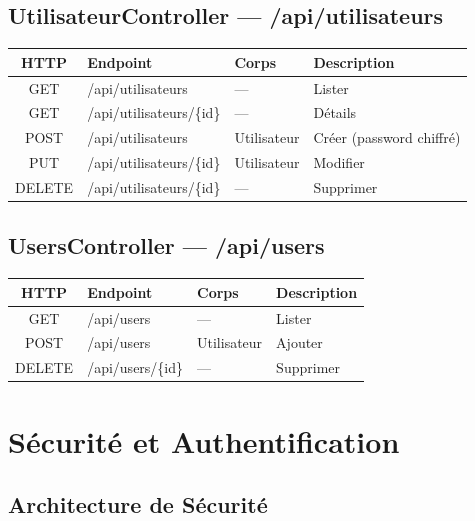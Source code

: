 \documentclass[12pt,a4paper]{report}
\begin{document}
\section{UtilisateurController --- /api/utilisateurs}

\begin{table}[H]
\centering
\begin{tabular}{|c|l|l|p{4cm}|}
\hline
\textbf{HTTP} & \textbf{Endpoint} & \textbf{Corps} & \textbf{Description} \\ \hline
GET & /api/utilisateurs & --- & Lister \\ \hline
GET & /api/utilisateurs/\{id\} & --- & Détails \\ \hline
POST & /api/utilisateurs & Utilisateur & Créer (password chiffré) \\ \hline
PUT & /api/utilisateurs/\{id\} & Utilisateur & Modifier \\ \hline
DELETE & /api/utilisateurs/\{id\} & --- & Supprimer \\ \hline
\end{tabular}
\end{table}

\section{UsersController --- /api/users}

\begin{table}[H]
\centering
\begin{tabular}{|c|l|l|p{4cm}|}
\hline
\textbf{HTTP} & \textbf{Endpoint} & \textbf{Corps} & \textbf{Description} \\ \hline
GET & /api/users & --- & Lister \\ \hline
POST & /api/users & Utilisateur & Ajouter \\ \hline
DELETE & /api/users/\{id\} & --- & Supprimer \\ \hline
\end{tabular}
\end{table}

\chapter{Sécurité et Authentification}

\section{Architecture de Sécurité}
\end{document}
